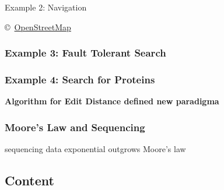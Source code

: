 \documentclass[notes=hide,pdftex,14pt]{beamer}
\begin{document}
\begin{frame}{Example 2: Navigation}
  \begin{tabcl}
  \eitem 
  \iitem{-2em} 
        \sitem 
        \eitem \copyright\,%
          \href{http://openstreetmap.org/}{OpenStreetMap}%
  \end{tabcl}%
  \end{frame}


\begin{frame}
  \frametitle{Example 3: Fault Tolerant Search}
  \begin{tabl}
  \iitem{-2em} 
  \end{tabl}
\end{frame}

\begin{frame}
  \frametitle{Example 4: Search for Proteins}
  \begin{tabp}
  \item \textbf{Algorithm for Edit Distance defined new paradigma}
  \eitem {} 
\eitem {} 
  \end{tabp}
\end{frame}

\begin{frame}
  \frametitle{Moore's Law and Sequencing}
  \begin{tabl}
  \iitem{1em}
\item<2-> sequencing data exponential outgrows Moore's law 
  \end{tabl}
\end{frame}


\subsection{Content}
\end{document}
